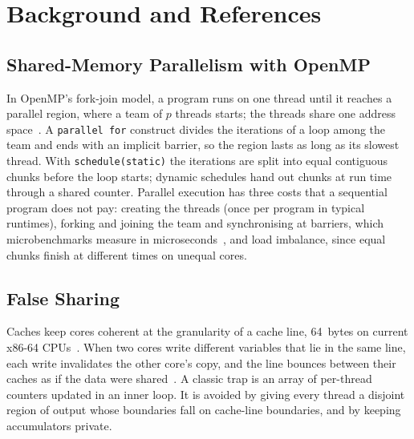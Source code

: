 \documentclass[conference,a4paper]{IEEEtran}
\newcommand{\code}[1]{\texttt{#1}}
\begin{document}
\section{Background and References}
\label{sec:background}

\subsection{Shared-Memory Parallelism with OpenMP}
In OpenMP's fork-join model, a program runs on one thread until it reaches a
parallel region, where a team of $p$ threads starts; the threads share one
address space~\cite{openmp52,chapman2008}. A \code{parallel for} construct
divides the iterations of a loop among the team and ends with an implicit
barrier, so the region lasts as long as its slowest thread. With
\code{schedule(static)} the iterations are split into equal contiguous chunks
before the loop starts; dynamic schedules hand out chunks at run time through
a shared counter. Parallel execution has three costs that a sequential program
does not pay: creating the threads (once per program in typical runtimes),
forking and joining the team and synchronising at barriers, which
microbenchmarks measure in microseconds~\cite{bull1999}, and load imbalance,
since equal chunks finish at different times on unequal cores.

\subsection{False Sharing}
Caches keep cores coherent at the granularity of a cache line, 64~bytes on
current x86-64 CPUs~\cite{hennessy2017,drepper2007}. When two cores write
different variables that lie in the same line, each write invalidates the
other core's copy, and the line bounces between their caches as if the data
were shared~\cite{torrellas1994}. A classic trap is an array of per-thread
counters updated in an inner loop. It is avoided by giving every thread a
disjoint region of output whose boundaries fall on cache-line boundaries, and
by keeping accumulators private.
\end{document}
